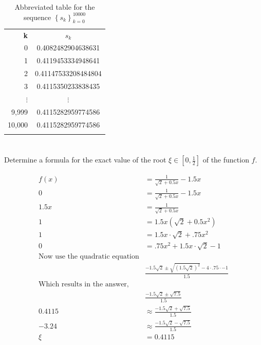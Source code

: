 \documentclass{article}
\begin{document}
\begin{table}[H]
    \centering
    \begin{tabular}{|r|c|}
        \Xhline{1 pt}
         \textbf{k}& \textbf{$s_k$}  \\
         \Xhline{1.5 pt}
         0 & 0.4082482904638631\\
         \Xhline{1 pt}
         1 & 0.4119453334948641\\
         \Xhline{1 pt}
         2 & 0.41147533208484804\\
         \Xhline{1 pt}
         3 & 0.4115350233838435\\
         \Xhline{1 pt}
         $\vdots$ & $\vdots$\\
          \Xhline{1 pt}
         9,999 & 0.4115282959774586\\
          \Xhline{1 pt}
         10,000 & 0.4115282959774586\\
         \Xhline{1 pt}
    \end{tabular}
    \caption{Abbreviated table for the sequence $\left\{ s_k\right\}_{k=0}^{10000}$}
    \label{tab:10sequence}
\end{table}


\section{}
Determine a formula for the exact value of the root $\xi \in \left[0,\frac{1}{2} \right]$ of the function $f$.
\vspace{10mm}

\begin{align*}
    f(x) &= \frac{1}{\sqrt{2}+0.5x}-1.5x\\
    0 & = \frac{1}{\sqrt{2}+0.5x}-1.5x\\
    1.5x &= \frac{1}{\sqrt{2}+0.5x}\\
    1 &= 1.5x(\sqrt{2}+0.5x^2)\\
    1 &= 1.5x\cdot \sqrt{2}+ .75x^2\\
    0 &=  .75x^2+ 1.5x\cdot \sqrt{2}-1\\
    \text{Now use the quadratic equation}&\\
    &\frac{-1.5\sqrt{2} \pm \sqrt{(1.5\sqrt{2})^2}-4\cdot.75\cdot -1}{1.5}\\
    \text{Which results in the answer,}&\\
    &\frac{-1.5\sqrt{2}\pm \sqrt{7.5}}{1.5}\\
    0.4115 &\approx \frac{-1.5\sqrt{2}+ \sqrt{7.5}}{1.5}\\
    -3.24 &\approx \frac{-1.5\sqrt{2}- \sqrt{7.5}}{1.5}\\
    \xi &= 0.4115\\
\end{align*}
\end{document}
